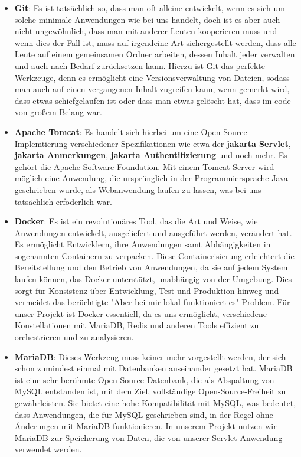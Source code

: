 \begin{itemize}
\item \textbf{Git}: Es ist tatsächlich so, dass man oft alleine entwickelt, wenn es sich um solche minimale Anwendungen wie bei uns handelt, doch ist es aber auch nicht ungewöhnlich, dass man mit anderer Leuten kooperieren muss und wenn dies der Fall ist, muss auf irgendeine Art sichergestellt werden, dass alle Leute auf einem gemeinsamen Ordner arbeiten, dessen Inhalt jeder verwalten und auch nach Bedarf zurücksetzen kann. Hierzu ist Git das perfekte Werkzeuge, denn es ermöglicht eine Versionsverwaltung von Dateien, sodass man auch auf einen vergangenen Inhalt zugreifen kann, wenn gemerkt wird, dass etwas schiefgelaufen ist oder dass man etwas gelöscht hat, dass im code von großem Belang war.

\item \textbf{Apache Tomcat}: Es handelt sich hierbei um eine Open-Source-Implemtierung verschiedener Spezifikationen wie etwa der \textbf{jakarta Servlet}, \textbf{jakarta Anmerkungen}, \textbf{jakarta Authentifizierung} und noch mehr. Es gehört die Apache Software Foundation. Mit einem Tomcat-Server wird möglich eine Anwendung, die ursprünglich in der Programmiersprache Java geschrieben wurde, als Webanwendung laufen zu lassen, was bei uns tatsächlich erfoderlich war.

\item \textbf{Docker}: Es ist ein revolutionäres Tool, das die Art und Weise, wie Anwendungen entwickelt, ausgeliefert und ausgeführt werden, verändert hat. Es ermöglicht Entwicklern, ihre Anwendungen samt Abhängigkeiten in sogenannten Containern zu verpacken. Diese Containerisierung erleichtert die Bereitstellung und den Betrieb von Anwendungen, da sie auf jedem System laufen können, das Docker unterstützt, unabhängig von der Umgebung. Dies sorgt für Konsistenz über Entwicklung, Test und Produktion hinweg und vermeidet das berüchtigte \/"Aber bei mir lokal funktioniert es"\/ Problem. Für unser Projekt ist Docker essentiell, da es uns ermöglicht, verschiedene Konstellationen mit MariaDB, Redis und anderen Tools effizient zu orchestrieren und zu analysieren.

\item \textbf{MariaDB}: Dieses Werkzeug muss keiner mehr vorgestellt werden, der sich schon zumindest einmal mit Datenbanken auseinander gesetzt hat. MariaDB ist eine sehr berühmte Open-Source-Datenbank, die als Abspaltung von MySQL entstanden ist, mit dem Ziel, vollständige Open-Source-Freiheit zu gewährleisten. Sie bietet eine hohe Kompatibilität mit MySQL, was bedeutet, dass Anwendungen, die für MySQL geschrieben sind, in der Regel ohne Änderungen mit MariaDB funktionieren. In unserem Projekt nutzen wir MariaDB zur Speicherung von Daten, die von unserer Servlet-Anwendung verwendet werden.


\end{itemize}
